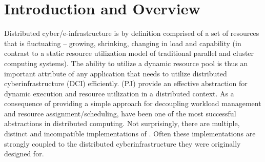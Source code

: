 \documentclass{sig-alternate}
\begin{document}

\upp
\section{Introduction and Overview} 

Distributed cyber/e-infrastructure is by definition comprised of a set
of resources that is fluctuating -- growing, shrinking, changing in
load and capability (in contrast to a static resource utilization
model of traditional parallel and cluster computing systems).  The
ability to utilize a dynamic resource pool is thus an important
attribute of any application that needs to utilize distributed
cyberinfrastructure (DCI) efficiently. \pilotjobs (PJ) provide an
effective abstraction for dynamic execution and resource utilization
in a distributed context. As a consequence of providing a simple
approach for decoupling workload management and resource
assignment/scheduling, \pilotjobs have been one of the most successful
abstractions in distributed computing.  Not surprisingly, there are
multiple, distinct and incompatible implementations of
\pilotjobs. Often these implementations are strongly coupled to the
distributed cyberinfrastructure they were originally designed for.

\end{document}

